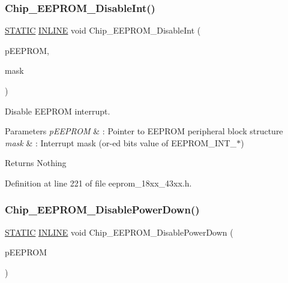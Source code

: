 \subsubsection{\texorpdfstring{Chip\+\_\+\+E\+E\+P\+R\+O\+M\+\_\+\+Disable\+Int()}{Chip\_EEPROM\_DisableInt()}}
{\footnotesize\ttfamily \hyperlink{group___l_p_c___types___public___macros_ga10b2d890d871e1489bb02b7e70d9bdfb}{S\+T\+A\+T\+IC} \hyperlink{spifi__18xx__43xx_8h_a2eb6f9e0395b47b8d5e3eeae4fe0c116}{I\+N\+L\+I\+NE} void Chip\+\_\+\+E\+E\+P\+R\+O\+M\+\_\+\+Disable\+Int (\begin{DoxyParamCaption}\item[{\hyperlink{struct_l_p_c___e_e_p_r_o_m___t}{L\+P\+C\+\_\+\+E\+E\+P\+R\+O\+M\+\_\+T} $\ast$}]{p\+E\+E\+P\+R\+OM,  }\item[{uint32\+\_\+t}]{mask }\end{DoxyParamCaption})}



Disable E\+E\+P\+R\+OM interrupt. 


\begin{DoxyParams}{Parameters}
{\em p\+E\+E\+P\+R\+OM} & \+: Pointer to E\+E\+P\+R\+OM peripheral block structure \\
\hline
{\em mask} & \+: Interrupt mask (or-\/ed bits value of E\+E\+P\+R\+O\+M\+\_\+\+I\+N\+T\+\_\+$\ast$) \\
\hline
\end{DoxyParams}
\begin{DoxyReturn}{Returns}
Nothing 
\end{DoxyReturn}


Definition at line 221 of file eeprom\+\_\+18xx\+\_\+43xx.\+h.

\mbox{\label{group___e_e_p_r_o_m__18_x_x__43_x_x_ga6cf4052474abe94b3c47ce09b67bb03f}} 
\subsubsection{\texorpdfstring{Chip\+\_\+\+E\+E\+P\+R\+O\+M\+\_\+\+Disable\+Power\+Down()}{Chip\_EEPROM\_DisablePowerDown()}}
{\footnotesize\ttfamily \hyperlink{group___l_p_c___types___public___macros_ga10b2d890d871e1489bb02b7e70d9bdfb}{S\+T\+A\+T\+IC} \hyperlink{spifi__18xx__43xx_8h_a2eb6f9e0395b47b8d5e3eeae4fe0c116}{I\+N\+L\+I\+NE} void Chip\+\_\+\+E\+E\+P\+R\+O\+M\+\_\+\+Disable\+Power\+Down (\begin{DoxyParamCaption}\item[{\hyperlink{struct_l_p_c___e_e_p_r_o_m___t}{L\+P\+C\+\_\+\+E\+E\+P\+R\+O\+M\+\_\+T} $\ast$}]{p\+E\+E\+P\+R\+OM }\end{DoxyParamCaption})}



